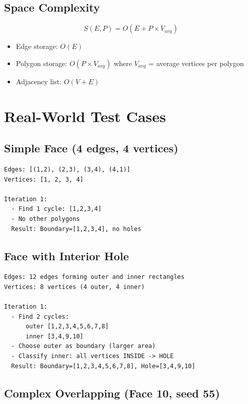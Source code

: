 \documentclass[11pt]{article}
\begin{document}
\subsection{Space Complexity}

\begin{equation}
S(E, P) = O(E + P \times V_{avg})
\end{equation}

\begin{itemize}
    \item Edge storage: $O(E)$
    \item Polygon storage: $O(P \times V_{avg})$ where $V_{avg}$ = average vertices per polygon
    \item Adjacency list: $O(V + E)$
\end{itemize}

\section{Real-World Test Cases}

\subsection{Simple Face (4 edges, 4 vertices)}

\begin{lstlisting}[caption={Simple rectangular face},label={lst:simple}]
Edges: [(1,2), (2,3), (3,4), (4,1)]
Vertices: [1, 2, 3, 4]

Iteration 1:
  - Find 1 cycle: [1,2,3,4]
  - No other polygons
  Result: Boundary=[1,2,3,4], no holes
\end{lstlisting}

\subsection{Face with Interior Hole}

\begin{lstlisting}[caption={Face with rectangular hole},label={lst:hole}]
Edges: 12 edges forming outer and inner rectangles
Vertices: 8 vertices (4 outer, 4 inner)

Iteration 1:
  - Find 2 cycles: 
      outer [1,2,3,4,5,6,7,8]
      inner [3,4,9,10]
  - Choose outer as boundary (larger area)
  - Classify inner: all vertices INSIDE -> HOLE
  Result: Boundary=[1,2,3,4,5,6,7,8], Hole=[3,4,9,10]
\end{lstlisting}

\subsection{Complex Overlapping (Face 10, seed 55)}
\end{document}
